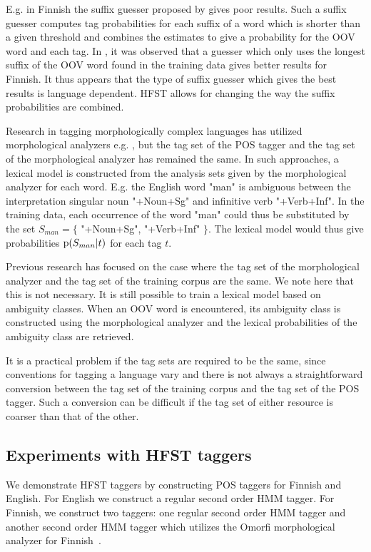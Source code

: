 \documentclass{llncs}
\begin{document}
E.g. in Finnish the suffix guesser proposed by \cite{Brants:2000} gives
poor results. Such a suffix guesser computes tag probabilities for
each suffix of a word which is shorter than a given threshold and
combines the estimates to give a probability for the OOV word and
each tag. In \cite{silfverberg/2011/nodalida}, it was observed that a guesser
which only uses the longest suffix of the OOV word found in the
training data gives better results for Finnish. It thus appears that the type of suffix
guesser which gives the best results is language dependent. HFST
allows for changing the way the suffix probabilities are combined.

Research in tagging morphologically complex languages has utilized
morphological analyzers e.g. \cite{Tzoukerman:1996,Oravecz:2002}, but
the tag set of the POS tagger and the tag set of the
morphological analyzer has remained the same. In such approaches, a
lexical model is constructed from the analysis sets given by the
morphological analyzer for each word. E.g. the English word "man" is
ambiguous between the interpretation singular noun "+Noun+Sg" and
infinitive verb "+Verb+Inf". In the training data, each occurrence of
the word "man" could thus be substituted by the set $S_{man} = \{$
"+Noun+Sg", "+Verb+Inf" $\}$. The lexical model would thus give
probabilities ${\rm p}(S_{man}|t)$ for each tag $t$. 

Previous research has focused on the case where the tag set of the
morphological analyzer and the tag set of the training corpus are the
same. We note here that this is not necessary.
It is still possible to train a lexical model based on
ambiguity classes. When an OOV word is encountered, its ambiguity
class is constructed using the morphological analyzer and the lexical
probabilities of the ambiguity class are retrieved.

It is a practical problem if the tag sets are required to be the
same, since conventions for tagging a
language vary and there is not always a straightforward conversion
between the tag set of the training corpus and the tag set of the
POS tagger. Such a conversion can be difficult if the tag
set of either resource is coarser than that of the other.

\subsection{Experiments with HFST taggers}

We demonstrate HFST taggers by constructing POS taggers for Finnish
and English. For English we construct a regular second order HMM
tagger. For Finnish, we construct two taggers: one regular second
order HMM tagger and another second order HMM tagger which utilizes
the Omorfi morphological analyzer for Finnish~\cite{pirinen/2008}.
\end{document}

